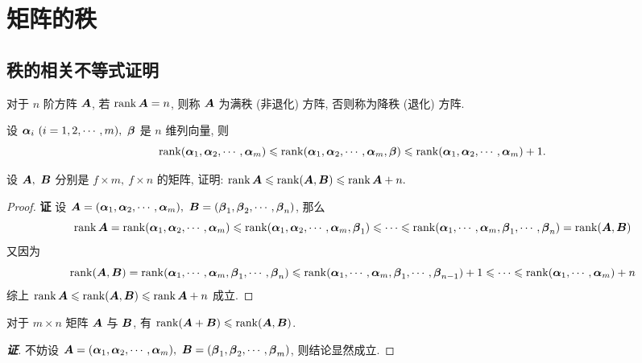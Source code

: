 \section{矩阵的秩}

\subsection{秩的相关不等式证明}

\begin{definition}[满秩方阵]
    对于 $n$ 阶方阵 $\vb*{A}$, 若 $\rank\vb*{A}=n$, 则称 $\vb*{A}$ 为满秩 (非退化) 方阵, 否则称为降秩 (退化) 方阵.
\end{definition}

\begin{theorem}[矩阵与向量组秩的联系]
    设 $\vb*{\alpha}_i~ (i=1,2,\cdots,m),~\vb*{\beta}$ 是 $n$ 维列向量, 则
    $$\rank(\vb*{\alpha}_1,\vb*{\alpha}_2,\cdots,\vb*{\alpha}_m)\leqslant \rank(\vb*{\alpha}_1,\vb*{\alpha}_2,\cdots,\vb*{\alpha}_m,\vb*{\beta})\leqslant \rank(\vb*{\alpha}_1,\vb*{\alpha}_2,\cdots,\vb*{\alpha}_m)+1.$$
\end{theorem}

\begin{example}
    设 $\vb*{A},~\vb*{B}$ 分别是 $f\times m,~f\times n$ 的矩阵, 证明: $\rank\vb*{A}\leqslant \rank(\vb*{A},\vb*{B})\leqslant \rank\vb*{A}+n.$
\end{example}
\begin{proof}{\songti \textbf{证}}
    设 $\vb*{A}=(\vb*{\alpha}_1,\vb*{\alpha}_2,\cdots,\vb*{\alpha}_m),~\vb*{B}=(\vb*{\beta}_1,\vb*{\beta}_2,\cdots,\vb*{\beta}_n)$, 那么 
    $$\rank\vb*{A}=\rank(\vb*{\alpha}_1,\vb*{\alpha}_2,\cdots,\vb*{\alpha}_m)\leqslant \rank(\vb*{\alpha}_1,\vb*{\alpha}_2,\cdots,\vb*{\alpha}_m,\vb*{\beta}_1)\leqslant\cdots\leqslant \rank(\vb*{\alpha}_1,\cdots,\vb*{\alpha}_m,\vb*{\beta}_1,\cdots,\vb*{\beta}_n)=\rank(\vb*{A},\vb*{B})$$
    又因为 
    $$\rank(\vb*{A},\vb*{B})=\rank(\vb*{\alpha}_1,\cdots,\vb*{\alpha}_m,\vb*{\beta}_1,\cdots,\vb*{\beta}_n)\leqslant \rank(\vb*{\alpha}_1,\cdots,\vb*{\alpha}_m,\vb*{\beta}_1,\cdots,\vb*{\beta}_{n-1})+1\leqslant \cdots\leqslant \rank(\vb*{\alpha}_1,\cdots,\vb*{\alpha}_m)+n$$
    综上 $\rank\vb*{A}\leqslant \rank(\vb*{A},\vb*{B})\leqslant \rank\vb*{A}+n$ 成立.
\end{proof}

\begin{theorem}
    对于 $m\times n$ 矩阵 $\vb*{A}$ 与 $\vb*{B}$, 有 $\rank(\vb*{A}+\vb*{B})\leqslant \rank(\vb*{A},\vb*{B})$.
\end{theorem}
\begin{proof}[{\songti \textbf{证}}]
    不妨设 $\vb*{A}=(\vb*{\alpha}_1,\vb*{\alpha}_2,\cdots,\vb*{\alpha}_m),~\vb*{B}=(\vb*{\beta}_1,\vb*{\beta}_2,\cdots,\vb*{\beta}_m)$, 则结论显然成立.
\end{proof}

